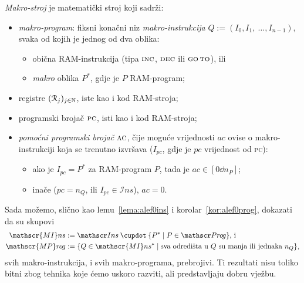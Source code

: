 \begin{definicija}[{name=[makro-stroj]}]
\emph{Makro-stroj} je matematički stroj koji sadrži:
\begin{itemize}
    \item \emph{makro-program}: fiksni konačni niz \emph{makro-instrukcija} $Q:=(I_0, I_1,~\dotsc, I_{n-1})$,\\ svaka od kojih je jednog od dva oblika:
    \begin{itemize}
        \item obična RAM-instrukcija (tipa $\textsc{inc}$, $\textsc{dec}$ ili $\textsc{go\,to}$), ili
        \item  \emph{makro} oblika $P^*$, gdje je $P$ RAM-program;
    \end{itemize}
    \item registre $(\mathcal R_{j})_{j\in{\mathbb N}}$, iste kao i kod RAM-stroja;
    \item programski brojač $\textsc{pc}$, isti kao i kod RAM-stroja;
    \item \emph{pomoćni programski brojač} $\textsc{ac}$, čije  moguće vrijednosti $ac$ ovise o makro-instrukciji koja se trenutno izvršava ($I_{pc}$, gdje je $pc$ vrijednost od \textsc{pc}):
    \begin{itemize}
        \item ako je $I_{pc}=P^*$ za RAM-program $P$, tada je $ac\in[0\dd n_P]$;
        \item inače ($pc=n_Q$, ili $I_{pc}\!\in\mathscr Ins$), $ac=0$.\qedhere
    \end{itemize}
\end{itemize}
\end{definicija}
\noindent Sada možemo, slično kao lemu~\ref{lema:alef0ins} i korolar~\ref{kor:alef0prog}, dokazati da su skupovi
\begin{align}
	\mathscr{MI}ns&:=\mathscr Ins\mathbin{\dcup}\{P^*\mid P\in\mathscr Pr\mspace{-1mu}o\mspace{-2mu}g\}\text{, i}\\
	\mathscr{MP}r\mspace{-1mu}o\mspace{-2mu}g&:=\{Q\in\mathscr{MI}ns^*\mid\text{sva odredišta u $Q$ su manja ili jednaka $n_Q$}\}\text,
\end{align}
svih makro-instrukcija, i svih makro-programa, prebrojivi. Ti rezultati nisu toliko bitni zbog tehnika koje ćemo uskoro razviti, ali predstavljaju dobru vježbu. %


